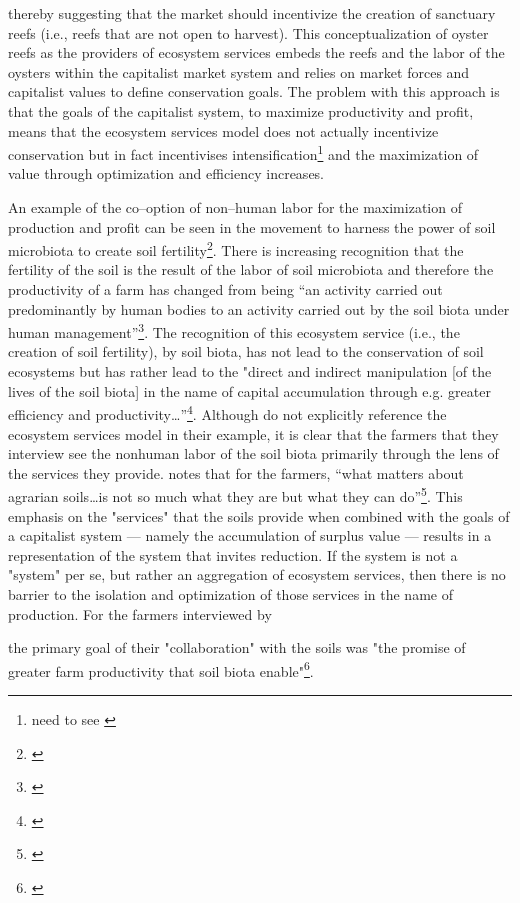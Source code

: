 \documentclass{article}
\begin{document}
thereby suggesting that the market should incentivize the creation of sanctuary reefs (i.e., reefs that are not open to harvest). This conceptualization of oyster reefs as the providers of ecosystem services embeds the reefs and the labor of the oysters within the capitalist market system and relies on market forces and capitalist values to define conservation goals. The problem with this approach is that the goals of the capitalist system, to maximize productivity and profit, means that the ecosystem services model does not actually incentivize conservation but in fact incentivises intensification\footnote{need to see \cite{bommarco_ecological_2013}} and the maximization of value through optimization and efficiency increases. 

An example of the co--option of non--human labor for the maximization of production and profit can be seen in the movement to harness the power of soil microbiota to create soil fertility\footnote{\cite{krz_nonhuman_2020}}. There is increasing recognition that the fertility of the soil is the result of the labor of soil microbiota and therefore the productivity of a farm has changed from being ``an activity carried out predominantly by human bodies to an activity carried out by the soil biota under human management''\footnote{\cite[p. ?]{krz_nonhuman_2020}}. The recognition of this ecosystem service (i.e., the creation of soil fertility), by soil biota, has not lead to the conservation of soil ecosystems but has rather lead to the "direct and indirect manipulation [of the lives of the soil biota] in the name of capital accumulation through e.g. greater efficiency and productivity\ldots''\footnote{\cite[p. 239]{krz_nonhuman_2020}}. Although \citeauthor{krz_nonhuman_2020} do not explicitly reference the ecosystem services model in their example, it is clear that the farmers that they interview see the nonhuman labor of the soil biota primarily through the lens of the services they provide. \citeauthor{krz_nonhuman_2020} notes that for the farmers, ``what matters about agrarian soils\ldots is not so much what they are but what they can do''\footnote{\cite[p. 234]{krz_nonhuman_2020}}. This emphasis on the "services" that the soils provide when combined with the goals of a capitalist system --- namely the accumulation of surplus value --- results in a representation of the system that invites reduction. If the system is not a "system" per se, but rather an aggregation of ecosystem services, then there is no barrier to the isolation and optimization of those services in the name of production. For the farmers interviewed by {\cite{krz_nonhuman_2020} the primary goal of their "collaboration" with the soils was "the promise of greater farm productivity that soil biota enable"\footnote{\cite[p. 243]{krz_nonhuman_2020}}.

}
\end{document}
